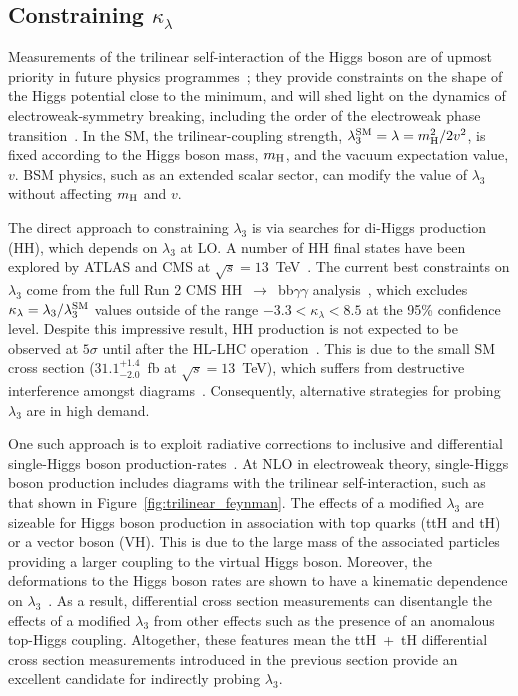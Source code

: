 \subsection{Constraining $\kappa_\lambda$}
Measurements of the trilinear self-interaction of the Higgs boson are of upmost priority in future physics programmes~\cite{Cepeda:2019klc}; they provide constraints on the shape of the Higgs potential close to the minimum, and will shed light on the dynamics of electroweak-symmetry breaking, including the order of the electroweak phase transition~\cite{PhysRevD.13.974,PhysRevD.20.2619,Kajantie:1995kf,Csikor:1998eu}. In the SM, the trilinear-coupling strength, $\lambda^{\rm{SM}}_3=\lambda=m_{\rm{H}}^2/2v^2$, is fixed according to the Higgs boson mass, $m_{\rm{H}}$, and the vacuum expectation value, $v$. BSM physics, such as an extended scalar sector, can modify the value of $\lambda_3$ without affecting $m_{\rm{H}}$ and $v$.

The direct approach to constraining $\lambda_3$ is via searches for di-Higgs production (HH), which depends on $\lambda_3$ at LO. A number of HH final states have been explored by ATLAS and CMS at $\sqrt{s}=13$~TeV~\cite{Sirunyan:2018ayu,Aad:2019uzh}. The current best constraints on $\lambda_3$ come from the full Run 2 CMS HH~$\rightarrow$~bb$\gamma\gamma$ analysis~\cite{Sirunyan:2020xok}, which excludes $\kappa_\lambda=\lambda_3/\lambda_3^{\rm{SM}}$ values outside of the range $-3.3 < \kappa_\lambda < 8.5$ at the 95\% confidence level. Despite this impressive result, HH production is not expected to be observed at $5\sigma$ until after the HL-LHC operation~\cite{Cepeda:2019klc}. This is due to the small SM cross section ($31.1^{+1.4}_{-2.0}$~fb at $\sqrt{s}=13$~TeV), which suffers from destructive interference amongst diagrams~\cite{Grazzini:2018bsd}. Consequently, alternative strategies for probing $\lambda_3$ are in high demand.

One such approach is to exploit radiative corrections to inclusive and differential single-Higgs boson production-rates~\cite{Degrassi:2016wml,Maltoni:2017ims,Gorbahn:2016uoy,Bizon:2016wgr,DiVita:2017eyz}. At NLO in electroweak theory, single-Higgs boson production includes diagrams with the trilinear self-interaction, such as that shown in Figure~\ref{fig:trilinear_feynman}. The effects of a modified $\lambda_3$ are sizeable for Higgs boson production in association with top quarks (ttH and tH) or a vector boson (VH). This is due to the large mass of the associated particles providing a larger coupling to the virtual Higgs boson. Moreover, the deformations to the Higgs boson rates are shown to have a kinematic dependence on $\lambda_3$~\cite{Maltoni:2017ims,DiVita:2017eyz}. As a result, differential cross section measurements can disentangle the effects of a modified $\lambda_3$ from other effects such as the presence of an anomalous top-Higgs coupling. Altogether, these features mean the ttH~+~tH differential cross section measurements introduced in the previous section provide an excellent candidate for indirectly probing $\lambda_3$.

